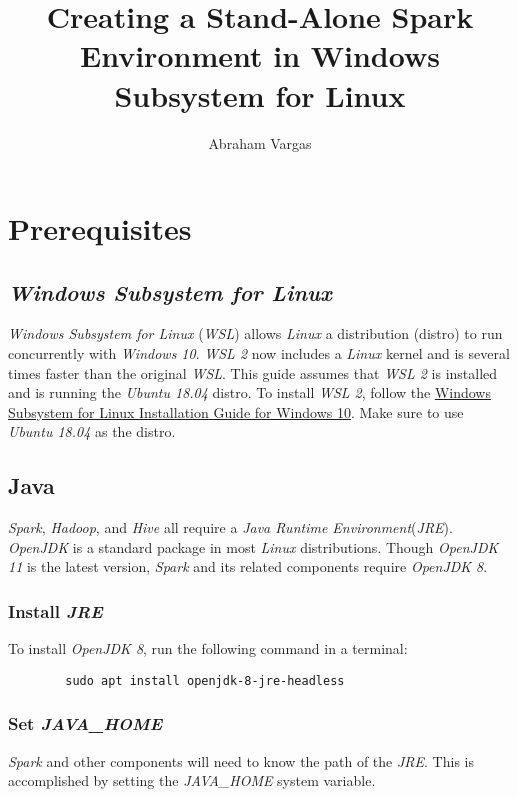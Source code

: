 \documentclass{article}
\begin{document}
\title{Creating a Stand-Alone Spark Environment in Windows Subsystem for Linux}
\author{Abraham Vargas}
\maketitle

\newpage
\tableofcontents
\newpage

\section{Prerequisites}

    \subsection{\emph{Windows Subsystem for Linux}}
    \emph{Windows Subsystem for Linux} (\emph{WSL}) allows \emph{Linux} a distribution (distro) to
    run concurrently with \emph{Windows 10}. \emph{WSL 2} now includes a \emph{Linux}
    kernel and is several times faster than the original \emph{WSL}. This guide assumes that \emph{WSL 2}
    is installed and is running the \emph{Ubuntu 18.04} distro. To install \emph{WSL 2}, follow the
    \href{https://docs.microsoft.com/en-us/windows/wsl/install-win10}{Windows Subsystem for Linux Installation Guide for Windows 10}.
    Make sure to use \emph{Ubuntu 18.04} as the distro.

    \subsection{Java}
    \emph{Spark}, \emph{Hadoop}, and \emph{Hive} all require a \emph{Java Runtime Environment}(\emph{JRE}).
    \emph{OpenJDK} is a standard package in most \emph{Linux} distributions. Though \emph{OpenJDK 11}
    is the latest version, \emph{Spark} and its related components require \emph{OpenJDK 8}.
    
        \subsubsection{Install \emph{JRE}}
        To install \emph{OpenJDK 8}, run the following command in a terminal:
        \begin{verbatim}
        sudo apt install openjdk-8-jre-headless            
        \end{verbatim}

        \subsubsection{Set \emph{JAVA\_HOME}}
        \emph{Spark} and other components will need to know the path of the
        \emph{JRE}. This is accomplished by setting the \emph{JAVA\_HOME}
        system variable.
\end{document}
